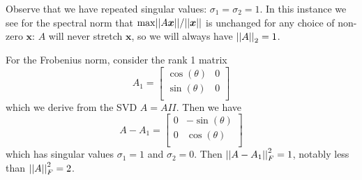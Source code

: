 \documentclass[a4paper]{article}
\begin{document}
Observe that we have repeated singular values: \(\sigma_{1} = \sigma_{2} = 1\). In this instance we see for the spectral norm that \(\max \abs{\abs{A \bm{x}}} / \abs{\abs{\bm{x}}}\) is unchanged for any choice of non-zero \(\bm{x}\): \(A\) will never stretch \(\bm{x}\), so we will always have \(\abs{\abs{A}}_{2} = 1\).

For the Frobenius norm, consider the rank 1 matrix
\[
	A_{1} = 
	\begin{bmatrix}
		\cos\left( \theta  \right) & 0 \\
		\sin\left( \theta  \right) & 0 \\
	\end{bmatrix}
\]
which we derive from the SVD \(A = AII\). Then we have
\[
	A - A_{1} =
	\begin{bmatrix}
		0 & -\sin\left( \theta  \right) \\
		0 & \cos\left( \theta  \right) \\
	\end{bmatrix}
\]
which has singular values \(\sigma_{1} = 1\) and \(\sigma_{2} = 0\). Then \(\abs{\abs{A - A_{1}}}_{F}^{2} = 1\), notably less than \(\abs{\abs{A}}_{F}^{2} = 2\).

\vspace{12pt}

\end{document}
